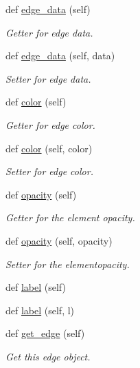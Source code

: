 \begin{DoxyCompactItemize}
def \hyperlink{classbridges_1_1edge_1_1_edge_abc3f52467d38ad2d7e06113d0c714ed6}{edge\+\_\+data} (self)
\begin{DoxyCompactList}\small\item\em Getter for edge data. \end{DoxyCompactList}\item 
def \hyperlink{classbridges_1_1edge_1_1_edge_a7429980b52d754159629c73c316cbc41}{edge\+\_\+data} (self, data)
\begin{DoxyCompactList}\small\item\em Setter for edge data. \end{DoxyCompactList}\item 
def \hyperlink{classbridges_1_1edge_1_1_edge_a24a4845aeae4ca6fc432b6d0b7fa78c2}{color} (self)
\begin{DoxyCompactList}\small\item\em Getter for edge color. \end{DoxyCompactList}\item 
def \hyperlink{classbridges_1_1edge_1_1_edge_a81ccb5ffd5838829e1a2217846c4df77}{color} (self, color)
\begin{DoxyCompactList}\small\item\em Setter for edge color. \end{DoxyCompactList}\item 
def \hyperlink{classbridges_1_1edge_1_1_edge_ab65d08382b8773d4051e2a1161db8ca6}{opacity} (self)
\begin{DoxyCompactList}\small\item\em Getter for the element opacity. \end{DoxyCompactList}\item 
def \hyperlink{classbridges_1_1edge_1_1_edge_aa2dca1c00c4d2ec377cdb0dd8eefd93d}{opacity} (self, opacity)
\begin{DoxyCompactList}\small\item\em Setter for the elementopacity. \end{DoxyCompactList}\item 
def \hyperlink{classbridges_1_1edge_1_1_edge_a3a2e3ddaeb54695f9e076eb89a8108fd}{label} (self)
\item 
def \hyperlink{classbridges_1_1edge_1_1_edge_a16327b62c38de382f24a4e3a06bd5648}{label} (self, l)
\item 
def \hyperlink{classbridges_1_1edge_1_1_edge_a406b906ea8e177a6e54f6c794c04df3d}{get\+\_\+edge} (self)
\begin{DoxyCompactList}\small\item\em Get this edge object. \end{DoxyCompactList}\end{DoxyCompactItemize}
